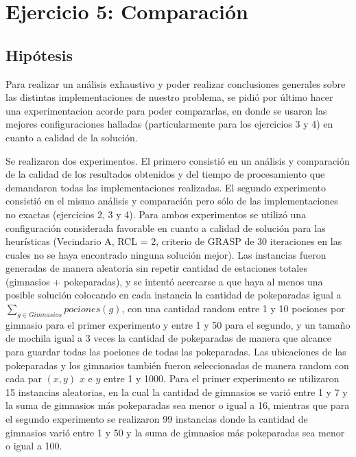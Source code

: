 \section{Ejercicio 5: Comparación}


    \subsection{Hipótesis}
        Para realizar un análisis exhaustivo y poder realizar conclusiones generales sobre las distintas implementaciones de nuestro problema, se pidió por último hacer una experimentacion acorde para poder compararlas, en donde se usaron las mejores configuraciones halladas (particularmente para los ejercicios 3 y 4) en cuanto a calidad de la solución.

        Se realizaron dos experimentos. El primero consistió en un análisis y comparación de la calidad de los resultados obtenidos y del tiempo de procesamiento que demandaron todas las implementaciones realizadas. El segundo experimento consistió en el mismo análisis y comparación pero sólo de las implementaciones no exactas (ejercicios 2, 3 y 4). Para ambos experimentos se utilizó una configuración considerada favorable en cuanto a calidad de solución para las heurísticas (Vecindario A, RCL = 2, criterio de GRASP de 30 iteraciones en las cuales no se haya encontrado ninguna solución mejor).
        Las instancias fueron generadas de manera aleatoria sin repetir cantidad de estaciones totales (gimnasios + pokeparadas), y se intentó acercarse a que haya al menos una posible solución colocando en cada instancia la cantidad de pokeparadas igual a $\sum_{g \in Gimnasios} pociones(g)$, con una cantidad random entre 1 y 10 pociones por gimnasio para el primer experimento y entre 1 y 50 para el segundo, y un tamaño de mochila igual a 3 veces la cantidad de pokeparadas de manera que alcance para guardar todas las pociones de todas las pokeparadas. Las ubicaciones de las pokeparadas y los gimnasios también fueron seleccionadas de manera random con cada par $(x,y)$ $x$ e $y$ entre 1 y 1000. Para el primer experimento se utilizaron 15 instancias aleatorias, en la cual la cantidad de gimnasios se varió entre 1 y 7 y la suma de gimnasios más pokeparadas sea menor o igual a 16, mientras que para el segundo experimento se realizaron 99 instancias donde la cantidad de gimnasios varió entre 1 y 50 y la suma de gimnasios más pokeparadas sea menor o igual a 100.


